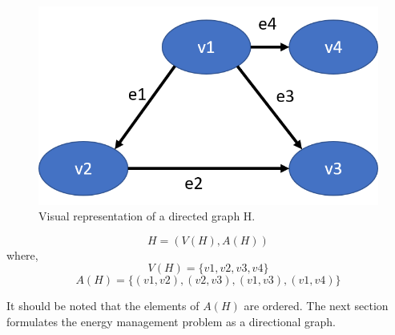 \begin{figure}[!htb]
\centering
\includegraphics[width=0.5\linewidth]{figs/A8/D_graph.png}
\caption{Visual representation of a directed graph H.}
\label{fig:D_graph}
\vspace{-3mm}
\end{figure}

\begin{equation}
\label{eq:GRAPH2}
   H = (V(H), A(H))
\end{equation}
where,
$$
V(H) = \{v1,v2,v3,v4\} 
$$
$$
A(H) = \{(v1,v2), (v2,v3), (v1,v3), (v1,v4)\}
$$

It should be noted that the elements of $A(H)$ are ordered. The next section formulates the energy management problem as a directional graph.